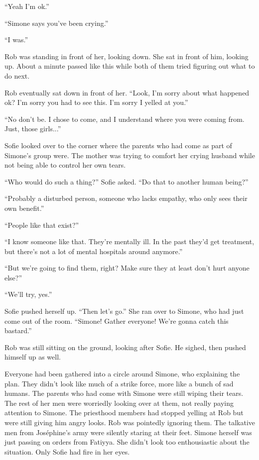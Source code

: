 \documentclass[letterpaper,12pt]{report}
\begin{document}
``Yeah I'm ok.''

``Simone says you've been crying.''

``I was.''

Rob was standing in front of her, looking down. She sat in front of him, looking up. About a minute passed like this while both of them tried figuring out what to do next. 

Rob eventually sat down in front of her. ``Look, I'm sorry about what happened ok? I'm sorry you had to see this. I'm sorry I yelled at you.''

``No don't be. I chose to come, and I understand where you were coming from. Just, those girls...''

Sofie looked over to the corner where the parents who had come as part of Simone's group were. The mother was trying to comfort her crying husband while not being able to control her own tears.

``Who would do such a thing?'' Sofie asked. ``Do that to another human being?''

``Probably a disturbed person, someone who lacks empathy, who only sees their own benefit.''

``People like that exist?''

``I know someone like that. They're mentally ill. In the past they'd get treatment, but there's not a lot of mental hospitals around anymore.''

``But we're going to find them, right? Make sure they at least don't hurt anyone else?''

``We'll try, yes.''

Sofie pushed herself up. ``Then let's go.'' She ran over to Simone, who had just come out of the room. ``Simone! Gather everyone! We're gonna catch this bastard.''

Rob was still sitting on the ground, looking after Sofie. He sighed, then pushed himself up as well.
\act

Everyone had been gathered into a circle around Simone, who explaining the plan. They didn't look like much of a strike force, more like a bunch of sad humans. The parents who had come with Simone were still wiping their tears. The rest of her men were worriedly looking over at them, not really paying attention to Simone. The priesthood members had stopped yelling at Rob but were still giving him angry looks. Rob was pointedly ignoring them. The talkative men from Jos\'ephine's army were silently staring at their feet. Simone herself was just passing on orders from Fatiyya. She didn't look too enthousiastic about the situation. Only Sofie had fire in her eyes.
\end{document}
